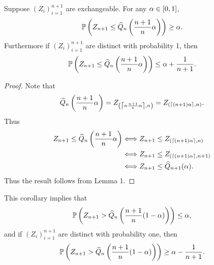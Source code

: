 \begin{cor}
    Suppose $(Z_i)_{i=1}^{n+1}$ are exchangeable. For any ${\alpha} \in [0,1]$,
    \[{\mathbb{P}}\left(Z_{n+1} \le \widehat{Q}_n\left(\frac{n+1}{n}{\alpha}\right)\right) \ge {\alpha}.\]
    Furthermore if $(Z_i)_{i=1}^{n+1}$ are distinct with probability 1, then 
    \[{\mathbb{P}}\left(Z_{n+1} \le \widehat{Q}_n\left(\frac{n+1}{n}{\alpha}\right)\right) \le {\alpha}+\frac{1}{n+1}.\]
\end{cor}
\begin{proof}
    Note that 
    \[\widehat{Q}_n\left(\frac{n+1}{n}{\alpha}\right)=Z_{\left(\left\lceil n\frac{n+1}{n} {\alpha} \right\rceil,n\right)}=Z_{\left(\left\lceil (n+1) {\alpha} \right\rceil,n\right)}.\]
    Thus
    \begin{align*}
        Z_{n+1}  \le \widehat{Q}_n\left(\frac{n+1}{n}{\alpha}\right)&\Longleftrightarrow Z_{n+1} \le Z_{(\lceil (n+1){\alpha}\rceil,n)}\\
        &\Longleftrightarrow Z_{n+1}\le Z_{(\lceil (n+1){\alpha}\rceil,n+1)}\\
        &\Longleftrightarrow Z_{n+1}\le \widehat{Q}_{n+1}({\alpha}).
    \end{align*}
    Thus the result follows from Lemma 1.
\end{proof}
This corollary implies that 
\[{\mathbb{P}}\left(Z_{n+1} > \widehat{Q}_n\left(\frac{n+1}{n}(1-{\alpha})\right)\right) \le {\alpha}, \]
and if $(Z_i)_{i=1}^{n+1}$ are distinct with probability one, then 
\[{\mathbb{P}}\left(Z_{n+1} > \widehat{Q}_n\left(\frac{n+1}{n}(1-{\alpha})\right)\right) \ge {\alpha}-\frac{1}{n+1}. \]
